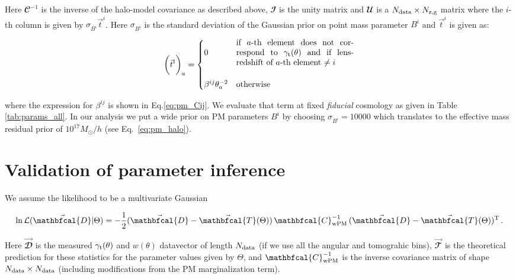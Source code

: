 \documentclass[aps, prd,twocolumn,superscriptaddress,nofootinbib,preprintnumbers]{revtex4-1}
\newcommand{\gammat}{\ensuremath{\gamma_{\rm t}(\theta)}}
\newcommand{\wtheta}{\ensuremath{w(\theta)}}
\begin{document}
Here ${\mathbfcal{C}}^{-1}$ is the inverse of the halo-model covariance as described above, $\mathbfcal{I}$ is the unity matrix and $\mathbfcal{U}$ is a $N_{\rm data} \times N_{\rm z,g}$ matrix where the $i$-th column is given by $\sigma_{B^i} \vec{t}^{i}$. Here $\sigma_{B^i}$ is the standard deviation of the  Gaussian prior on point mass parameter $B^i$ and $\vec{t}^{i}$ is given as:
\begin{linenomath*}
\begin{equation}
    \bigg(\vec{t}^{i} \bigg)_{a} = \begin{cases}
0 & \parbox{5cm}{if $a$-th element does not correspond to $\gammat$ and if lens-redshift of $a$-th element $\neq i$} \\  
\\
\beta^{ij}\theta_{a}^{-2} &\text{otherwise}
\end{cases}
\end{equation}
\end{linenomath*}
where the expression for $\beta^{ij}$ is shown in Eq.\ref{eq:pm_Cij}. We evaluate that term at fixed \textit{fiducial} cosmology as given in Table \ref{tab:params_all}. In our analysis we put a wide prior on PM parameters $B^i$ by choosing $\sigma_{B^i} = 10000$ which translates to the effective mass residual prior of $10^{17} M_{\odot}/h$ (see Eq.~\ref{eq:pm_halo}).


\section{Validation of parameter inference}
\label{sec:param_inf}
We assume the likelihood to be a multivariate Gaussian
\begin{linenomath*}
\begin{equation}
    \ln \mathcal{L}(\vec{\mathbfcal{D}}|\Theta) = -\frac{1}{2} (\vec{\mathbfcal{D}} - \vec{\mathbfcal{T}}(\Theta)) \, {\mathbfcal{C}}^{-1}_{\rm wPM} \,  (\vec{\mathbfcal{D}} - \vec{\mathbfcal{T}}(\Theta))^{\rm T} \,.
\end{equation}
\end{linenomath*}
Here $\vec{\mathbfcal{D}}$ is the measured $\gammat$ and $\wtheta$ datavector of length $N_{\rm data}$ (if we use all the angular and tomograhic bins), $\vec{\mathbfcal{T}}$ is the theoretical prediction for these statistics for the parameter values given by  $\Theta$, and ${\mathbfcal{C}}^{-1}_{\rm wPM}$ is the inverse covariance matrix of shape $N_{\rm data} \times N_{\rm data}$ (including modifications from the PM marginalization term).
\end{document}
